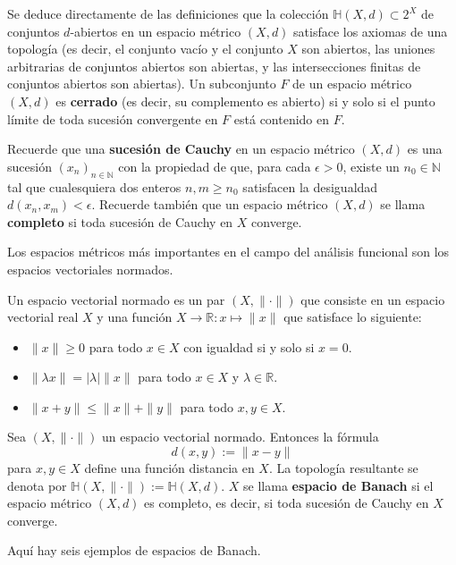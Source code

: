 Se deduce directamente de las definiciones que la colección $\mathbb{H}(X,d)\subset 2^{X}$ de conjuntos $d$-abiertos en un espacio métrico $(X, d)$ satisface los axiomas de una topología (es decir, el conjunto vacío y el conjunto $X$ son abiertos, las uniones arbitrarias de conjuntos abiertos son abiertas, y las intersecciones finitas de conjuntos abiertos son abiertas). Un subconjunto $F$ de un espacio métrico $(X, d)$ es \textbf{cerrado} (es decir, su complemento es abierto) si y solo si el punto límite de toda sucesión convergente en $F$ está contenido en $F$.

Recuerde que una \textbf{sucesión de Cauchy} en un espacio métrico $(X, d)$ es una sucesión $(x_{n})_{n\in\mathbb{N}}$ con la propiedad de que, para cada $\epsilon>0$, existe un $n_{0}\in\mathbb{N}$ tal que cualesquiera dos enteros $n, m\ge n_{0}$ satisfacen la desigualdad $d(x_{n},x_{m})<\epsilon$. Recuerde también que un espacio métrico $(X, d)$ se llama \textbf{completo} si toda sucesión de Cauchy en $X$ converge.

Los espacios métricos más importantes en el campo del análisis funcional son los espacios vectoriales normados.

\begin{definition}
Un espacio vectorial normado es un par $(X, \|\cdot\|)$ que consiste en un espacio vectorial real $X$ y una función $X\rightarrow\mathbb{R}: x \mapsto \|x\|$ que satisface lo siguiente:
\begin{itemize}
    \item[(N1)] $\|x\|\ge0$ para todo $x\in X$ con igualdad si y solo si $x=0$.
    \item[(N2)] $\|\lambda x\|=|\lambda|\|x\|$ para todo $x\in X$ y $\lambda\in\mathbb{R}$.
    \item[(N3)] $\|x+y\|\le\|x\|+\|y\|$ para todo $x,y\in X$.
\end{itemize}
\end{definition}

Sea $(X, \|\cdot\|)$ un espacio vectorial normado. Entonces la fórmula
\begin{equation}\label{eq:1.1}
d(x,y) := \|x-y\|
\end{equation}
para $x,y\in X$ define una función distancia en $X$. La topología resultante se denota por $\mathbb{H}(X,\|\cdot\|):=\mathbb{H}(X,d)$. $X$ se llama \textbf{espacio de Banach} si el espacio métrico $(X, d)$ es completo, es decir, si toda sucesión de Cauchy en $X$ converge.

Aquí hay seis ejemplos de espacios de Banach.

